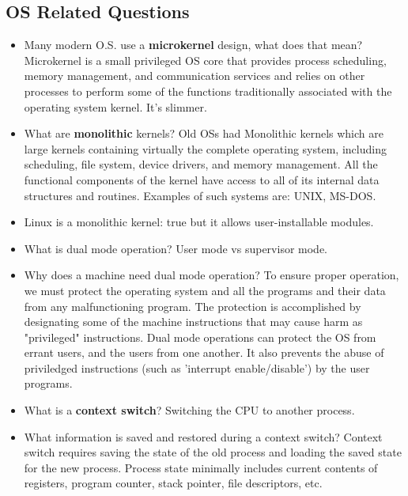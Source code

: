 \documentclass[fontsize=5pt]{scrartcl}
\begin{document}
\begin{multicols}{3}
    \subsection{OS Related Questions}
      \begin{itemize}
          \item Many modern O.S. use a \textbf{microkernel} design, what does that mean? Microkernel is a small privileged OS core that provides process
                scheduling, memory management, and communication services and relies on other processes to perform some of the functions 
                traditionally associated with the operating system kernel. It's slimmer.
          \item What are \textbf{monolithic} kernels? Old OSs had Monolithic kernels which are large kernels containing
                virtually the complete operating system, including scheduling, file 
                system, device drivers, and memory management.  All the functional
                components of the kernel have access to all of its internal data
                structures and routines. Examples of such systems are: UNIX, MS-DOS.
          \item Linux is a monolithic kernel: true but it allows user-installable modules.
          \item What is dual mode operation? User mode vs supervisor mode.
          \item Why does a machine need dual mode operation? To ensure proper operation, we must protect the operating system and all 
                the programs and their data from any malfunctioning program. 
                The protection is accomplished by designating some of the machine
                instructions that may cause harm as "privileged" instructions.
                Dual mode operations can protect the OS from errant users, and the users from one another. 
                It also prevents the abuse of priviledged instructions (such as 'interrupt enable/disable')
                by the user programs.
          \item What is a \textbf{context switch}? Switching the CPU to another process.
          \item What information is saved and restored during a context switch? Context switch requires saving the state of the old process and
                loading the saved state for the new process. Process state
                minimally includes current contents of registers, program counter,
                stack pointer, file descriptors, etc. 


\end{itemize}
\end{multicols}
\end{document}
